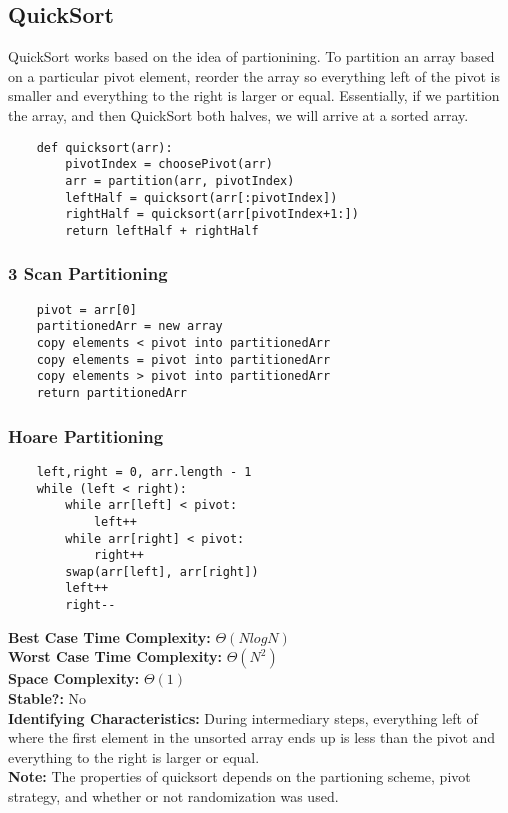 \documentclass{article}
\begin{document}
\subsection{QuickSort}
QuickSort works based on the idea of partionining. To partition an array based on a particular pivot element,
reorder the array so everything left of the pivot is smaller and everything to the right is larger or equal.
Essentially, if we partition the array, and then QuickSort both halves, we will arrive at a sorted array.
\begin{lstlisting}
    def quicksort(arr):
        pivotIndex = choosePivot(arr)
        arr = partition(arr, pivotIndex)
        leftHalf = quicksort(arr[:pivotIndex])
        rightHalf = quicksort(arr[pivotIndex+1:])
        return leftHalf + rightHalf
\end{lstlisting}
\subsubsection{3 Scan Partitioning}
\begin{lstlisting}
    pivot = arr[0]
    partitionedArr = new array
    copy elements < pivot into partitionedArr
    copy elements = pivot into partitionedArr
    copy elements > pivot into partitionedArr
    return partitionedArr
\end{lstlisting}
\subsubsection{Hoare Partitioning}
\begin{lstlisting}
    left,right = 0, arr.length - 1
    while (left < right):
        while arr[left] < pivot:
            left++
        while arr[right] < pivot:
            right++
        swap(arr[left], arr[right])
        left++
        right--
\end{lstlisting}
\textbf{Best Case Time Complexity:  } $\Theta(NlogN)$\\
\textbf{Worst Case Time Complexity: } $\Theta(N^2)$\\
\textbf{Space Complexity: } $\Theta(1)$\\
\textbf{Stable?: } No\\
\textbf{Identifying Characteristics: } During intermediary steps, everything left of where the first element in the unsorted array
ends up is less than the pivot and everything to the right is larger or equal.\\
\textbf{Note: } The properties of quicksort depends on the partioning scheme, pivot strategy, and whether or not randomization was used.
\end{document}
